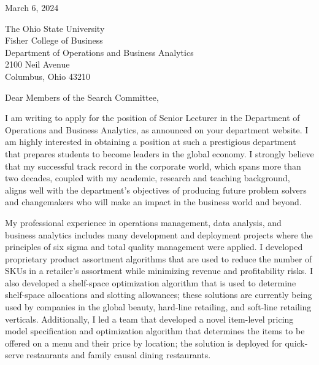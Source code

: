 

March 6, 2024\\

\vspace{2.0ex}

The Ohio State University \\
Fisher College of Business  \\
Department of Operations and Business Analytics \\
2100 Neil Avenue \\
Columbus, Ohio 43210 \\

\vspace{2.0ex}

Dear Members of the Search Committee, \\

\vspace{2.0ex}


I am writing to apply for the position of Senior Lecturer in the Department of  Operations and Business Analytics, as announced on your department website.  I am highly interested in obtaining a position at such a prestigious department that prepares students to become leaders in the global economy.  I strongly believe that my successful track record in the corporate world, which spans more than two decades, coupled with my academic, research and teaching background, aligns well with the department's objectives of producing future problem solvers and changemakers who will make an impact in the business world and beyond. \\

\vspace{2.0ex}

My professional experience in operations management, data analysis, and business analytics includes many development and deployment projects where the principles of six sigma and total quality management were applied.  I developed proprietary product assortment algorithms that are used to reduce the number of SKUs in a retailer's assortment while minimizing revenue and profitability risks.  I also developed a shelf-space optimization algorithm that is used to determine shelf-space allocations and slotting allowances;  these solutions are  currently being used by companies in the global beauty, hard-line retailing, and soft-line retailing verticals.  Additionally, I led a team that developed a novel item-level pricing model specification and optimization algorithm that determines the items to be offered on a menu and their price by location;  the solution is deployed for quick-serve restaurants and family causal dining restaurants.  

